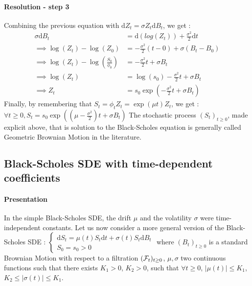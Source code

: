 \paragraph{Resolution - step 3}
Combining the previous equation with $\mathrm{d}Z_t = \sigma Z_t \mathrm{d}B_t$, we get : \newline
\begin{equation}
\begin{alignat*}{2}
\sigma \mathrm{d}B_t &= \mathrm{d}(log(Z_t)) + \frac{\sigma^2}{2} \mathrm{d}t \\
\implies \log(Z_t) -\log(Z_0) &= -\frac{\sigma^2}{2} (t - 0) + \sigma (B_t - B_0) \\
\implies \log(Z_t) -\log(\frac{S_0}{\phi_0}) &= -\frac{\sigma^2}{2} t + \sigma B_t \\
\implies \log(Z_t) &= \log(s_0) -\frac{\sigma^2}{2} t + \sigma B_t \\
\implies Z_t &= s_0 \exp(-\frac{\sigma^2}{2} t + \sigma B_t )
\end{alignat*}
\end{equation} \newline Finally, by remembering that $S_t = \phi_t Z_t = \exp(\mu t) Z_t$, we get :\newline
$\forall t \ge 0, S_t = s_0 \exp((\mu -\frac{\sigma^2}{2}) t + \sigma B_t)$
\newline The stochastic process $(S_t)_{t \ge 0}$, made explicit above, that is solution to the Black-Scholes equation is generally called Geometric Brownian Motion in the literature.
\subsection{Black-Scholes SDE with time-dependent coefficients }
\paragraph{Presentation} In the simple Black-Scholes SDE, the drift $\mu$ and the volatility $\sigma$ were time-independent constants. Let us now consider a more general version of the Black-Scholes SDE : \newline
$\left\{
\begin{array}{l}
\mathrm{d}S_t = \mu(t) S_t \mathrm{d}t + \sigma(t) S_t \mathrm{d}B_t\\
S_0 = s_0 > 0
\end{array}
\right.$ \newline where $(B_t)_{t \ge 0}$ is a standard Brownian Motion with respect to a filtration $({\cal{F}}_t)_{t \ge 0}$, $\mu, \sigma$ two continuous functions such that there exists $K_1 > 0$, $K_2 > 0$, such that $\forall t \ge 0$, $\lvert \mu(t) \rvert \le K_1$, $K_2 \le \lvert \sigma(t) \rvert \le K_1$.

